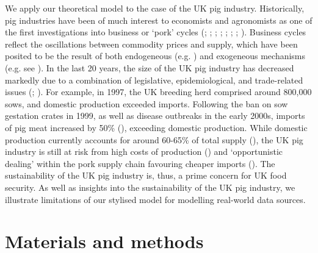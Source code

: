 \documentclass[12pt]{article}
\begin{document}
We apply our theoretical model to the case of the UK pig industry. Historically, pig industries have been of much interest to economists and agronomists as one of the first investigations into business or `pork' cycles (\cite{haldane1934}; \cite{coase1935}; \cite{ezekiel1938}; \cite{harlow1960}; \cite{meadows1971}; \cite{zawadzka2010}; \cite{parker2014}; \cite{sterman2000}). Business cycles reflect the oscillations between commodity prices and supply, which have been posited to be the result of both endogeneous (e.g. \cite{nerlove1958}) and exogeneous mechanisms (e.g. see \cite{gouel2012}). In the last 20 years, the size of the UK pig industry has decreased markedly due to a combination of legislative, epidemiological, and trade-related issues (\cite{taylor2006}; \cite{dawson2009}). For example, in 1997, the UK breeding herd comprised around 800,000 sows, and domestic production exceeded imports. Following the ban on sow gestation crates in 1999, as well as disease outbreaks in the early 2000s, imports of pig meat increased by 50\% (\cite{DEFRApigcattlestats2020}), exceeding domestic production. While domestic production currently accounts for around 60-65\% of total supply (\cite{DEFRApigcattlestats2020}), the UK pig industry is still at risk from high costs of production (\cite{BPEXprofitability2011}) and `opportunistic dealing' within the pork supply chain favouring cheaper imports (\cite{bowman2013}). The sustainability of the UK pig industry is, thus, a prime concern for UK food security. As well as insights into the sustainability of the UK pig industry, we illustrate limitations of our stylised model for modelling real-world data sources.

\section{Materials and methods}
\end{document}
